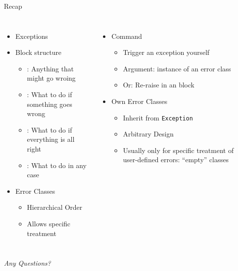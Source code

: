 
\begin{frame}[t,plain]
\titlepage
\end{frame}


\begin{frame}{Recap}
%
\begin{columns}[T]
\begin{itemize}
\item Exceptions
\item Block structure
	\begin{itemize}
	\item {}: Anything that might go wroing
	\item {}: What to do if something goes wrong
	\item {}: What to do if everything is all right
	\item {}: What to do in any case
	\end{itemize}
\item Error Classes
	\begin{itemize}
	\item Hierarchical Order
	\item Allows specific treatment
	\end{itemize}
\end{itemize}
%
\begin{itemize}
\item Command 
	\begin{itemize}
	\item Trigger an exception yourself
	\item Argument: instance of an error class
	\item Or: Re-raise in an  block
	\end{itemize}
\item Own Error Classes
	\begin{itemize}
	\item Inherit from \texttt{Exception}
	\item Arbitrary Design
	\item Usually only for specific treatment of user-defined errors: \enquote{empty} classes
	\end{itemize}
\end{itemize}

\end{columns}
%
\begin{center}
	\emph{Any Questions?}
\end{center}
%
\end{frame}

